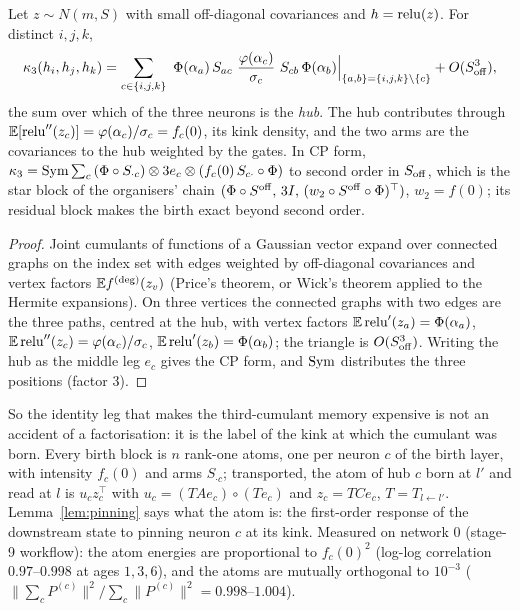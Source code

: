 \begin{theorem}\label{thm:birth}
Let $z\sim N(m,S)$ with small off-diagonal covariances and $h=\operatorname{relu}(z)$. For distinct $i,j,k$,
\[
\kap_3(h_i,h_j,h_k)=\sum_{c\in\{i,j,k\}}\ \Phi(\alpha_a)\,S_{ac}\ \frac{\varphi(\alpha_c)}{\sigma_c}\ S_{cb}\,\Phi(\alpha_b)\Big|_{\{a,b\}=\{i,j,k\}\setminus\{c\}}+O(S_{\rm off}^3),
\]
the sum over which of the three neurons is the \emph{hub}. The hub contributes through $\mathbb E[\operatorname{relu}''(z_c)]=\varphi(\alpha_c)/\sigma_c=
f_c(0)$, its kink density, and the two arms are the covariances to the hub weighted by the gates. In CP form,
$\kappa_3=\operatorname{Sym}\sum_c\,(\Phi\circ S_{\cdot c})\otimes 3e_c\otimes(f_c(0)\,S_{c\cdot}\circ\Phi)$ to second order in $S_{\rm off}$, which is the
star block of the organisers' chain $(\Phi\circ S^{\rm off},\,3I,\,(w_2\circ S^{\rm off}\circ\Phi)^{\top})$, $w_2=f(0)$; its
residual block makes the birth exact beyond second order.
\end{theorem}
\begin{proof}
Joint cumulants of functions of a Gaussian vector expand over connected graphs on the index set with edges weighted by
off-diagonal covariances and vertex factors $\mathbb E f^{(\deg)}(z_v)$ (Price's theorem, or Wick's theorem applied to the
Hermite expansions). On three vertices the connected graphs with two edges are the three paths, centred at the hub,
with vertex factors $\mathbb E\operatorname{relu}'(z_a)=\Phi(\alpha_a)$, $\mathbb E\operatorname{relu}''(z_c)=\varphi(\alpha_c)/\sigma_c$, $\mathbb E\operatorname{relu}'(z_b)=\Phi(\alpha_b)$; the
triangle is $O(S_{\rm off}^3)$. Writing the hub as the middle leg $e_c$ gives the CP form, and $\operatorname{Sym}$ distributes the three
positions (factor $3$).
\end{proof}

So the identity leg that makes the third-cumulant memory expensive is not an accident of a factorisation: it is the
label of the kink at which the cumulant was born. Every birth block is $n$ rank-one atoms, one per neuron $c$ of
the birth layer, with intensity $f_c(0)$ and arms $S_{\cdot c}$; transported, the atom of hub $c$ born at $l'$ and read at
$l$ is $u_c z_c^{\top}$ with $u_c=(T A e_c)\circ(T e_c)$ and $z_c=TCe_c$, $T=T_{l\leftarrow l'}$. Lemma~\ref{lem:pinning}
says what the atom is: the first-order response of the downstream state to pinning neuron $c$ at its kink.
Measured on network $0$ (stage-9 workflow): the atom energies are proportional to $f_c(0)^2$ (log-log correlation
$0.97$--$0.998$ at ages $1,3,6$), and the atoms are mutually orthogonal to $10^{-3}$
($\|\sum_cP^{(c)}\|^2/\sum_c\|P^{(c)}\|^2=0.998$--$1.004$).

